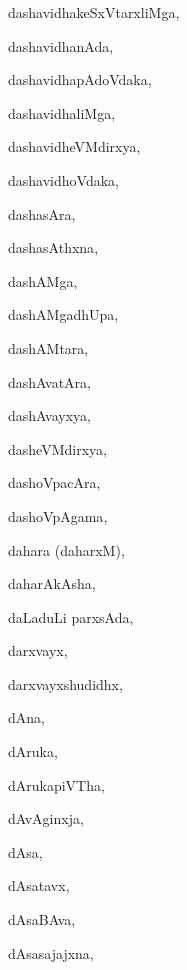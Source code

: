 \begin{multicols}{3}
{\noindent
{dashavidhakeSxVtarxliMga}, \pageref{dashavidhakeSxVtarxliMga}

\noindent
{dashavidhanAda}, \pageref{dashavidhanAda}

\noindent
{dashavidhapAdoVdaka}, \pageref{dashavidhapAdoVdaka}

\noindent
{dashavidhaliMga}, \pageref{dashavidhaliMga}

\noindent
{dashavidheVMdirxya}, \pageref{dashavidheVMdirxya}

\noindent
{dashavidhoVdaka}, \pageref{dashavidhoVdaka}

\noindent
{dashasAra}, \pageref{dashasAra}

\noindent
{dashasAthxna}, \pageref{dashasAthxna}

\noindent
{dashAMga}, \pageref{dashAMga}

\noindent
{dashAMgadhUpa}, \pageref{dashAMgadhUpa}

\noindent
{dashAMtara}, \pageref{dashAMtara}

\noindent
{dashAvatAra}, \pageref{dashAvatAra}

\noindent
{dashAvayxya}, \pageref{dashAvayxya}

\noindent
{dasheVMdirxya}, \pageref{dasheVMdirxya}

\noindent
{dashoVpacAra}, \pageref{dashoVpacAra}

\noindent
{dashoVpAgama}, \pageref{dashoVpAgama}

\noindent
{dahara (daharxM)}, \pageref{dahara daharxM}

\noindent
{daharAkAsha}, \pageref{daharAkAsha}

\noindent
{daLaduLi parxsAda}, \pageref{daLaduLi parxsAda}

\noindent
{darxvayx}, \pageref{darxvayx}

\noindent
{darxvayxshudidhx}, \pageref{darxvayxshudidhx}

\noindent
{dAna}, \pageref{dAna}

\noindent
{dAruka}, \pageref{dAruka}

\noindent
{dArukapiVTha}, \pageref{dArukapiVTha}

\noindent
{dAvAginxja}, \pageref{dAvAginxja}

\noindent
{dAsa}, \pageref{dAsa}

\noindent
{dAsatavx}, \pageref{dAsatavx}

\noindent
{dAsaBAva}, \pageref{dAsaBAva}

\noindent
{dAsasajajxna}, \pageref{dAsasajajxna}

}
\end{multicols}
